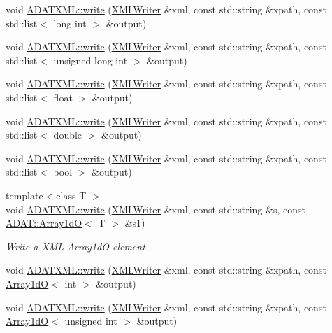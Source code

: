 \begin{DoxyCompactItemize}
void \mbox{\hyperlink{group__io_ga323fbb7d576696f27ec4eb34519c1fc7}{A\+D\+A\+T\+X\+M\+L\+::write}} (\mbox{\hyperlink{classADATXML_1_1XMLWriter}{X\+M\+L\+Writer}} \&xml, const std\+::string \&xpath, const std\+::list$<$ long int $>$ \&output)
\item 
void \mbox{\hyperlink{group__io_ga1cae344439dcb1355afb4b89f85e7e1b}{A\+D\+A\+T\+X\+M\+L\+::write}} (\mbox{\hyperlink{classADATXML_1_1XMLWriter}{X\+M\+L\+Writer}} \&xml, const std\+::string \&xpath, const std\+::list$<$ unsigned long int $>$ \&output)
\item 
void \mbox{\hyperlink{group__io_gaed1b6aaf88e89845ef30099ca6c5d933}{A\+D\+A\+T\+X\+M\+L\+::write}} (\mbox{\hyperlink{classADATXML_1_1XMLWriter}{X\+M\+L\+Writer}} \&xml, const std\+::string \&xpath, const std\+::list$<$ float $>$ \&output)
\item 
void \mbox{\hyperlink{group__io_ga9b4f1b7647f914a90edb448dc7fbb4e9}{A\+D\+A\+T\+X\+M\+L\+::write}} (\mbox{\hyperlink{classADATXML_1_1XMLWriter}{X\+M\+L\+Writer}} \&xml, const std\+::string \&xpath, const std\+::list$<$ double $>$ \&output)
\item 
void \mbox{\hyperlink{group__io_gaaeb2284c0481b6c39c20d3e2c283d933}{A\+D\+A\+T\+X\+M\+L\+::write}} (\mbox{\hyperlink{classADATXML_1_1XMLWriter}{X\+M\+L\+Writer}} \&xml, const std\+::string \&xpath, const std\+::list$<$ bool $>$ \&output)
\item 
{\footnotesize template$<$class T $>$ }\\void \mbox{\hyperlink{group__io_ga4aca42ea47cabf4b5644cf09729343ce}{A\+D\+A\+T\+X\+M\+L\+::write}} (\mbox{\hyperlink{classADATXML_1_1XMLWriter}{X\+M\+L\+Writer}} \&xml, const std\+::string \&s, const \mbox{\hyperlink{classADAT_1_1Array1dO}{A\+D\+A\+T\+::\+Array1dO}}$<$ T $>$ \&s1)
\begin{DoxyCompactList}\small\item\em Write a X\+ML Array1dO element. \end{DoxyCompactList}\item 
void \mbox{\hyperlink{group__io_gaa6e09c5b36ae52183896f9566e971ca5}{A\+D\+A\+T\+X\+M\+L\+::write}} (\mbox{\hyperlink{classADATXML_1_1XMLWriter}{X\+M\+L\+Writer}} \&xml, const std\+::string \&xpath, const \mbox{\hyperlink{classADAT_1_1Array1dO}{Array1dO}}$<$ int $>$ \&output)
\item 
void \mbox{\hyperlink{group__io_ga32f158a165ed5de5be9e8391eb747012}{A\+D\+A\+T\+X\+M\+L\+::write}} (\mbox{\hyperlink{classADATXML_1_1XMLWriter}{X\+M\+L\+Writer}} \&xml, const std\+::string \&xpath, const \mbox{\hyperlink{classADAT_1_1Array1dO}{Array1dO}}$<$ unsigned int $>$ \&output)

\end{DoxyCompactItemize}
